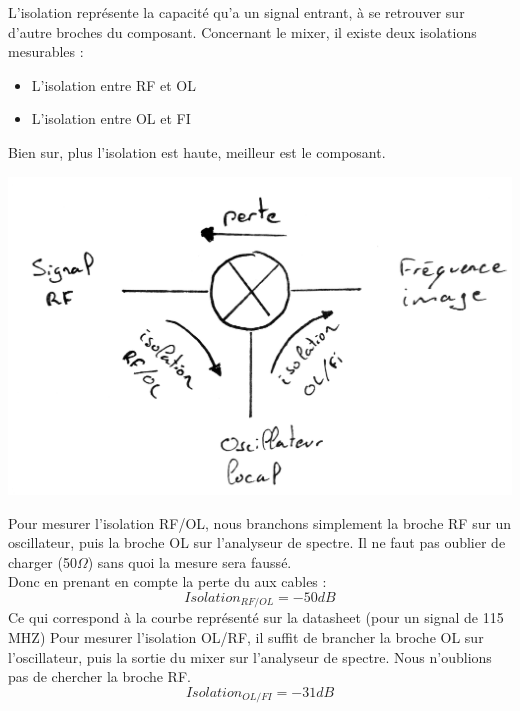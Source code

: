 \documentclass[a4paper,12pt]{report}            %
\begin{document}
    L'isolation représente la capacité qu'a un signal entrant, à se retrouver sur d'autre
broches du composant. Concernant le mixer, il existe deux isolations mesurables : 
\begin{itemize}
    \item L'isolation entre RF et OL
    \item L'isolation entre OL et FI
\end{itemize}
Bien sur, plus l'isolation est haute, meilleur est le composant.
\begin{center}\includegraphics[scale = 0.3]{pic/isolation.png}\\ \end{center}

    Pour mesurer l'isolation RF/OL, nous branchons simplement la broche RF sur un oscillateur, 
puis la broche OL sur l'analyseur de spectre. Il ne faut pas oublier de charger (50$\Omega$) sans
quoi la mesure sera faussé.\\
Donc en prenant en compte la perte du aux cables :\\
$$Isolation_{RF/OL} = -50dB$$
Ce qui correspond à la courbe représenté sur la datasheet (pour un signal de 115 MHZ)
    Pour mesurer l'isolation OL/RF, il suffit de brancher la broche OL sur l'oscillateur, 
puis la sortie du mixer sur l'analyseur de spectre. Nous n'oublions pas de chercher la
broche RF.
$$Isolation_{OL/FI} = -31dB$$
\end{document}
